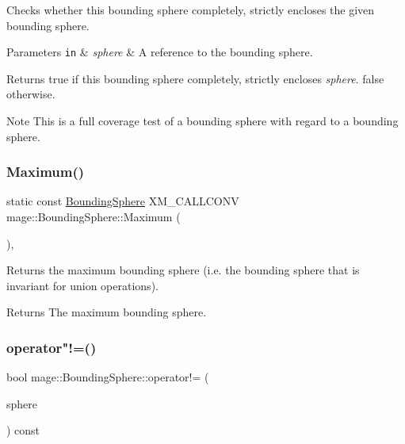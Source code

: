 Checks whether this bounding sphere completely, strictly encloses the given bounding sphere.


\begin{DoxyParams}[1]{Parameters}
\mbox{\tt in}  & {\em sphere} & A reference to the bounding sphere. \\
\hline
\end{DoxyParams}
\begin{DoxyReturn}{Returns}
{\ttfamily true} if this bounding sphere completely, strictly encloses {\itshape sphere}. {\ttfamily false} otherwise. 
\end{DoxyReturn}
\begin{DoxyNote}{Note}
This is a full coverage test of a bounding sphere with regard to a bounding sphere. 
\end{DoxyNote}
\mbox{\label{classmage_1_1_bounding_sphere_afbdb210289e14ceeb69d62d1d0585b93}} 
\subsubsection{\texorpdfstring{Maximum()}{Maximum()}}
{\footnotesize\ttfamily static const \mbox{\hyperlink{classmage_1_1_bounding_sphere}{Bounding\+Sphere}} X\+M\+\_\+\+C\+A\+L\+L\+C\+O\+NV mage\+::\+Bounding\+Sphere\+::\+Maximum (\begin{DoxyParamCaption}{ }\end{DoxyParamCaption})\hspace{0.3cm}{\ttfamily [static]}, {\ttfamily [noexcept]}}

Returns the maximum bounding sphere (i.\+e. the bounding sphere that is invariant for union operations).

\begin{DoxyReturn}{Returns}
The maximum bounding sphere. 
\end{DoxyReturn}
\mbox{\label{classmage_1_1_bounding_sphere_a841979aaee8a82784674296801aa5fbc}} 
\subsubsection{\texorpdfstring{operator"!=()}{operator!=()}}
{\footnotesize\ttfamily bool mage\+::\+Bounding\+Sphere\+::operator!= (\begin{DoxyParamCaption}\item[{const \mbox{\hyperlink{classmage_1_1_bounding_sphere}{Bounding\+Sphere}} \&}]{sphere }\end{DoxyParamCaption}) const\hspace{0.3cm}{\ttfamily [noexcept]}}

